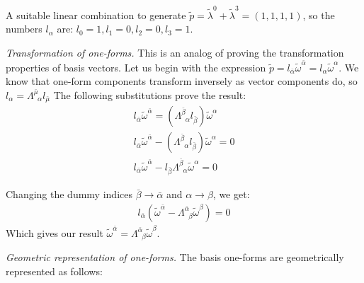 \documentclass{report}
\begin{document}
\begin{subquests}
\begin{subquests}
		\item		
		A suitable linear combination to generate $\tilde p = \tilde \lambda^0 + \tilde \lambda^3 = (1,1,1,1)$, so the numbers $l_{\alpha}$ are: $l_0 = 1, l_1 = 0, l_2 = 0, l_3 = 1$.
	\end{subquests}

	\item \emph{Transformation of one-forms.}
	This is an analog of proving the transformation properties of basis vectors. Let us begin with the expression $\tilde p = l_{\bar \alpha} \tilde\omega^{\bar \alpha} = l_{\alpha} \tilde\omega^{\alpha}$. We know that one-form components transform inversely as vector components do, so $l_{\alpha} = \Lambda^{\bar \mu}_{\;\;\alpha} l_{\bar \mu}$ The following substitutions prove the result:
	\begin{gather*}
		l_{\bar \alpha} \tilde \omega^{\bar \alpha} = (\Lambda^{\bar \beta}_{\;\;\alpha} l_{\bar \beta}) \tilde\omega^{\alpha} \\
		l_{\bar \alpha} \tilde \omega^{\bar \alpha} - (\Lambda^{\bar \beta}_{\;\;\alpha} l_{\bar \beta}) \tilde\omega^{\alpha} = 0 \\
		l_{\bar \alpha} \tilde \omega^{\bar \alpha} - l_{\bar \beta} \Lambda^{\bar \beta}_{\;\;\alpha} \tilde \omega^{\alpha} = 0
	\end{gather*}
	
	Changing the dummy indices $\bar \beta \to \bar \alpha$ and $\alpha \to \beta$, we get:
	\begin{gather*}
		l_{\bar \alpha} (\tilde \omega^{\bar \alpha} - \Lambda^{\bar \alpha}_{\;\;\beta} \tilde \omega^{\beta}) = 0 
	\end{gather*}
	Which gives our result $\tilde \omega^{\bar \alpha} = \Lambda^{\bar \alpha}_{\;\;\beta} \tilde \omega^{\beta}$.

	\item \emph{Geometric representation of one-forms.}
	The basis one-forms are geometrically represented as follows:
	\begin{center}
	\end{center}


\end{subquests}
\end{document}
